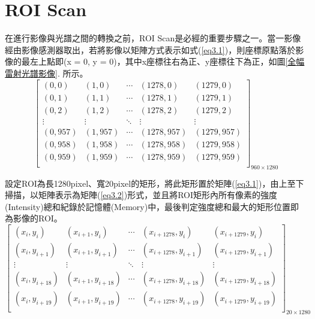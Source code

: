 \section{ROI Scan}
在進行影像與光譜之間的轉換之前，ROI Scan是必經的重要步驟之一。當一影像經由影像感測器取出，若將影像以矩陣方式表示如式(\ref{eq3.1})，則座標原點落於影像的最左上點即(x = 0, y = 0)，其中x座標往右為正、y座標往下為正，如圖\ref{全幅雷射光譜影像}. 所示。
\begin{equation}\label{eq3.1}
	\begin{bmatrix} 
		(0,0)&(1,0)&\cdots&(1278,0)&(1279,0)\\
		(0,1)&(1,1)&\cdots&(1278,1)&(1279,1)\\
		(0,2)&(1,2)&\cdots&(1278,2)&(1279,2)\\
		\vdots&\vdots&\ddots&\vdots&\vdots\\
		(0,957)&(1,957)&\cdots&(1278,957)&(1279,957)\\
		(0,958)&(1,958)&\cdots&(1278,958)&(1279,958)\\
		(0,959)&(1,959)&\cdots&(1278,959)&(1279,959)\\
	\end{bmatrix}_{960\times1280}
\end{equation}
\par
設定ROI為長1280pixel、寬20pixel的矩形，將此矩形置於矩陣(\ref{eq3.1})，由上至下掃描，以矩陣表示為矩陣(\ref{eq3.2})形式，並且將ROI矩形內所有像素的強度(Intensity)總和紀錄於記憶體(Memory)中，最後判定強度總和最大的矩形位置即為影像的ROI。
\begin{equation}\label{eq3.2}
	\begin{bmatrix} 
		(x_{i},y_{i})&(x_{i+1},y_{i})&\cdots&(x_{i+1278},y_{i})&(x_{i+1279},y_{i})\\
		(x_{i},y_{i+1})&(x_{i+1},y_{i+1})&\cdots&(x_{i+1278},y_{i+1})&(x_{i+1279},y_{i+1})\\
		\vdots&\vdots&\ddots&\vdots&\vdots\\
		(x_{i},y_{i+18})&(x_{i+1},y_{i+18})&\cdots&(x_{i+1278},y_{i+18})&(x_{i+1279},y_{i+18})\\
		(x_{i},y_{i+19})&(x_{i+1},y_{i+19})&\cdots&(x_{i+1278},y_{i+19})&(x_{i+1279},y_{i+19})\\
	\end{bmatrix}_{20\times1280}
\end{equation}
